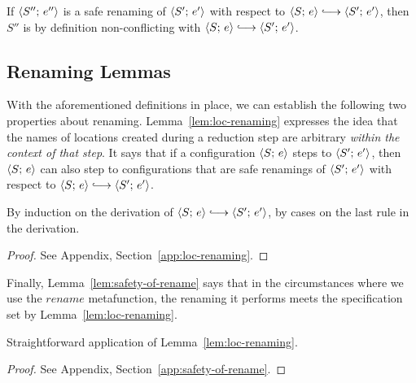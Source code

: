 \noindent If $\langle S'';\, e'' \rangle$ is a safe renaming of $\langle S';\, e' \rangle$ with
respect to $\config{S}{e} \parstepsto \config{S'}{e'}$, then $S''$ is
by definition non-conflicting with $\config{S}{e} \parstepsto
\config{S'}{e'}$.

\subsection{Renaming Lemmas}

With the aforementioned definitions in place, we can establish the
following two properties about renaming.
Lemma~\ref{lem:loc-renaming} expresses the idea that the names of
locations created during a reduction step are arbitrary \emph{within
  the context of that step}.  It says that if a configuration
$\langle S;\, e \rangle$ steps to $\langle S';\, e' \rangle$, then $\langle S;\, e \rangle$ can
also step to configurations that are safe renamings of
$\langle S';\, e' \rangle$ with respect to $\config{S}{e} \parstepsto
\config{S'}{e'}$.

\LemLocRenaming
\ifx\fulltr\undefined
\begin{proofsketch}
  By induction on the derivation of $\config{S}{e} \parstepsto
  \config{S'}{e'}$, by cases on the last rule in the derivation.
\end{proofsketch}
\else
\begin{proof}
See Appendix, Section~\ref{app:loc-renaming}.
\end{proof}
\fi

\noindent Finally, Lemma~\ref{lem:safety-of-rename} says that in the
circumstances where we use the $\mathit{rename}$ metafunction, the renaming it performs
meets the specification set by Lemma~\ref{lem:loc-renaming}.

\LemSafetyOfRename
\ifx\fulltr\undefined
\begin{proofsketch}
  Straightforward application of Lemma~\ref{lem:loc-renaming}.
\end{proofsketch}
\else
\begin{proof}
See Appendix, Section~\ref{app:safety-of-rename}.
\end{proof}
\fi
